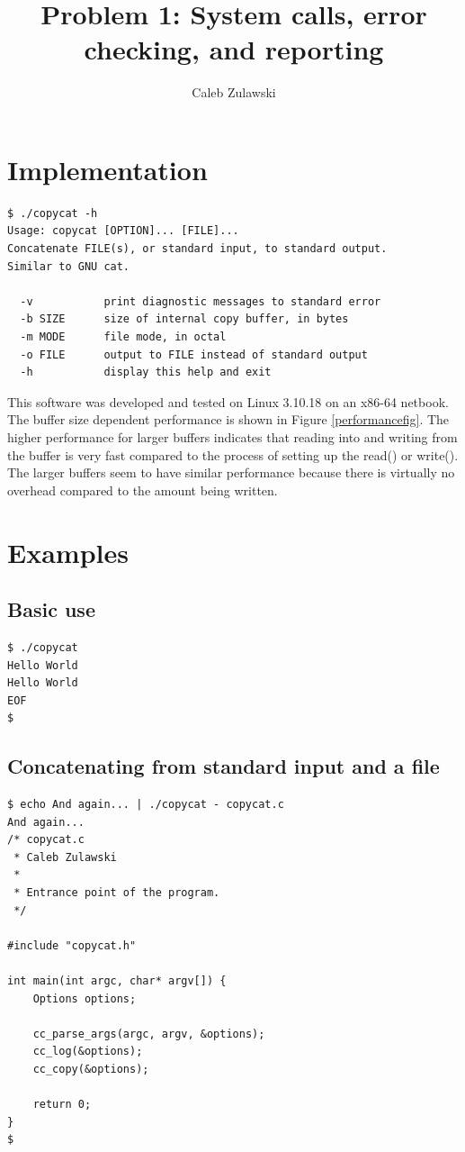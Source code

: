 \documentclass{article}
\begin{document}
\title{Problem 1: System calls, error checking, and reporting}
\author{Caleb Zulawski}

\maketitle

\section{Implementation}

\begin{lstlisting}
$ ./copycat -h
Usage: copycat [OPTION]... [FILE]...
Concatenate FILE(s), or standard input, to standard output.
Similar to GNU cat.

  -v           print diagnostic messages to standard error
  -b SIZE      size of internal copy buffer, in bytes
  -m MODE      file mode, in octal
  -o FILE      output to FILE instead of standard output
  -h           display this help and exit
\end{lstlisting}

This software was developed and tested on Linux 3.10.18 on an x86-64 netbook.
The buffer size dependent performance is shown in Figure \ref{performancefig}.
The higher performance for larger buffers indicates that reading into and writing from the buffer is very fast compared to the process of setting up the read() or write().
The larger buffers seem to have similar performance because there is virtually no overhead compared to the amount being written.

\section{Examples}

\subsection{Basic use}

\begin{lstlisting}
$ ./copycat 
Hello World
Hello World
EOF
$
\end{lstlisting}

\subsection{Concatenating from standard input and a file}

\begin{lstlisting}
$ echo And again... | ./copycat - copycat.c
And again...
/* copycat.c
 * Caleb Zulawski
 * 
 * Entrance point of the program.
 */

#include "copycat.h"

int main(int argc, char* argv[]) {
    Options options;
    
    cc_parse_args(argc, argv, &options);
    cc_log(&options);
    cc_copy(&options);

    return 0;
}
$
\end{lstlisting}
\end{document}
